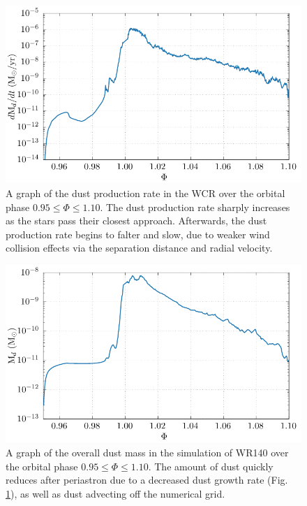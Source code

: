 \begin{figure}
  \centering
  \includegraphics{assets/wr140-dust_rate.pdf}
  \caption[A graph of the dust production rate in the WCR of WR140]{A graph of the dust production rate in the WCR over the orbital phase $0.95 \leq \Phi \leq 1.10$. The dust production rate sharply increases as the stars pass their closest approach. Afterwards, the dust production rate begins to falter and slow, due to weaker wind collision effects via the separation distance and radial velocity.}
  \label{fig:wr140-dustproduction}
\end{figure}

\begin{figure}
  \centering
  \includegraphics{assets/wr140-m_dust-g.pdf}
  \caption[A graph of the overall dust mass in the simulation of WR140]{A graph of the overall dust mass in the simulation of WR140 over the orbital phase $0.95 \leq \Phi \leq 1.10$. The amount of dust quickly reduces after periastron due to a decreased dust growth rate (Fig. \ref{fig:wr140-dustproduction}), as well as dust advecting off the numerical grid.}
  \label{fig:wr140-dustmass}
\end{figure}

